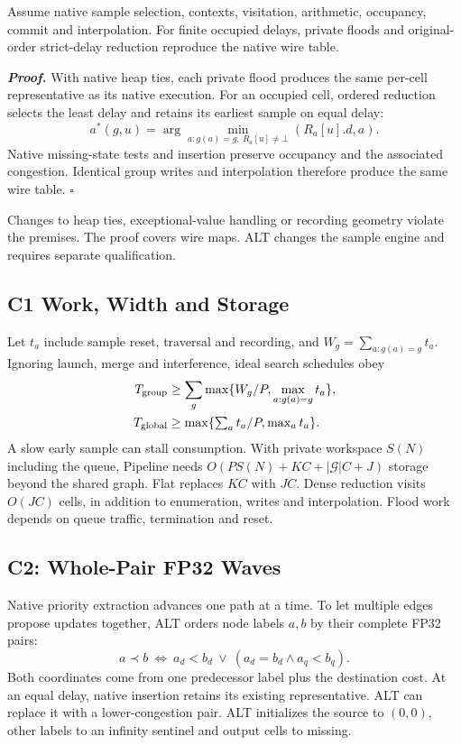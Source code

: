 \begin{proposition}\label{prop:strict}
Assume native sample selection, contexts, visitation, arithmetic, occupancy, commit and interpolation. For finite occupied delays, private floods and original-order strict-delay reduction reproduce the native wire table.
\end{proposition}
\noindent\textbf{\emph{Proof.}} With native heap ties, each private flood produces the same per-cell representative as its native execution. For an occupied cell, ordered reduction selects the least delay and retains its earliest sample on equal delay:
\begin{equation}
 a^*(g,u)=\arg\min_{a:g(a)=g,\ R_a[u]\ne\bot}(R_a[u].d,a).
\end{equation}
Native missing-state tests and insertion preserve occupancy and the associated congestion. Identical group writes and interpolation therefore produce the same wire table. $\square$

Changes to heap ties, exceptional-value handling or recording geometry violate the premises. The proof covers wire maps. ALT changes the sample engine and requires separate qualification.

\subsection{C1 Work, Width and Storage}
Let $t_a$ include sample reset, traversal and recording, and $W_g=\sum_{a:g(a)=g}t_a$. Ignoring launch, merge and interference, ideal search schedules obey
\begin{align}
 T_{\rm group}&\geq\sum_g\max\{W_g/P,\max_{a:g(a)=g}t_a\},\\
 T_{\rm global}&\geq\max\{\textstyle\sum_a t_a/P,\max_a t_a\}.
\end{align}
A slow early sample can stall consumption. With private workspace $S(N)$ including the queue, Pipeline needs $O(P S(N)+KC+|\mathcal G|C+J)$ storage beyond the shared graph. Flat replaces $KC$ with $JC$. Dense reduction visits $O(JC)$ cells, in addition to enumeration, writes and interpolation. Flood work depends on queue traffic, termination and reset.

\subsection{C2: Whole-Pair FP32 Waves}
Native priority extraction advances one path at a time. To let multiple edges propose updates together, ALT orders node labels $a,b$ by their complete FP32 pairs:
\begin{equation}
 a\prec b\ \Longleftrightarrow\ a_d<b_d\ \lor\ (a_d=b_d\land a_q<b_q).
\end{equation}
Both coordinates come from one predecessor label plus the destination cost. At an equal delay, native insertion retains its existing representative. ALT can replace it with a lower-congestion pair. ALT initializes the source to $(0,0)$, other labels to an infinity sentinel and output cells to missing.

